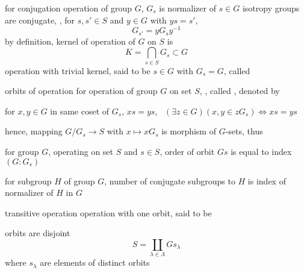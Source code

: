 \documentclass[17pt,landscape]{foils}
\begin{document}
{\bit
\vitem
	for conjugation operation of group $G$,
	$G_s$ is normalizer of $s\in G$
\vitem
	isotropy groups are conjugate,
	\eg, for $s,s'\in S$ and $y\in G$ with $ys=s'$,
	$$
		G_{s'} = yG_s y^{-1}
	$$
\vitem
	by definition, kernel of operation of $G$ on $S$ is
	$$
		K = \bigcap_{s\in S} G_s \subset G
	$$
\vitem
	operation with trivial kernel, said to be %
\vitem
	$s\in G$ with $G_s = G$, called %
\eit



\begin{mydefinition}{orbits of operation}%
	for operation of group $G$ on set $S$,
	,
	called ,
	denoted by \
\end{mydefinition}

\bit
\item
	for $x,y\in G$ in same coset of $G_s$, $xs = ys$, \ie\
	$
		\left(
			\exists z\in G
		\right)
		\left(
			x,y \in zG_s
		\right)
		\Leftrightarrow
		xs = ys
	$
\item hence, mapping $G/G_s \to S$ with $x \mapsto x G_s$
	is morphism of $G$-sets, thus
\eit

\begin{myproposition}{}
	for group $G$, operating on set $S$ and $s\in S$,
	order of orbit $Gs$ is equal to index $(G:G_s)$
\end{myproposition}

\vfill
\begin{myproposition}{}
	for subgroup $H$ of group $G$,
	number of conjugate subgroups to $H$
	is index of normalizer of $H$ in $G$\
\end{myproposition}

\vfill
\begin{mydefinition}{transitive operation}%
		\index{transitive!group!operation}
	operation with one orbit, said to be 
\end{mydefinition}

\vfill


\bit
\item
	orbits are disjoint
	$$
		S = \coprod_{\lambda \in \Lambda} Gs_\lambda
	$$
	where $s_\lambda$ are elements of distinct orbits
\eit

}
\end{document}
